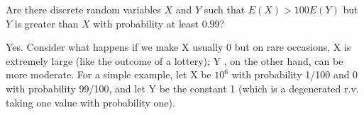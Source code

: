 
\setcounter{theorem}{12}
\begin{exercise} [BH.4.13] Are there discrete random variables $X$ and $Y$ such that $E(X) > 100E(Y)$ but $Y$ is greater than $X$ with probability at least 0.99?
\begin{solution}
    Yes. Consider what happens if we make X usually 0 but on rare occasions, X is extremely large (like the outcome of a lottery); Y , on the other hand, can be more moderate. For a simple example, let X be $10^6$ with probability 1/100 and 0 with probability 99/100, and let Y be the constant 1 (which is a degenerated r.v. taking one value with probability one). 
\end{solution}
\end{exercise}

